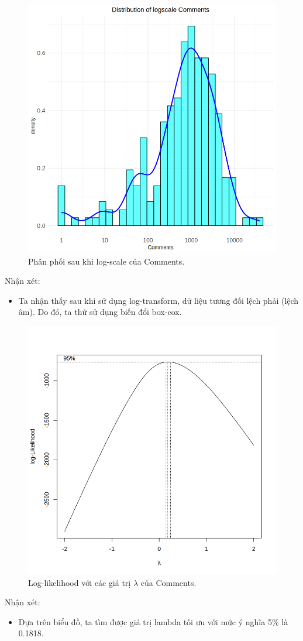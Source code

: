 \begin{figure}[H]
    \centering
    \includegraphics[width=0.75\columnwidth]{csm_figures/comments_logscale_distribution.png}
    \caption{Phân phối sau khi log-scale của Comments.}
    \label{fig:comments_logscale_distribution}
\end{figure}
Nhận xét:
\begin{itemize}
    \item Ta nhận thấy sau khi sử dụng log-transform, dữ liệu tương đối lệch phải (lệch âm). Do đó, ta thử sử dụng biến đổi box-cox.
\end{itemize}

\begin{figure}[H]
    \centering
    \includegraphics[width=0.75\columnwidth]{csm_figures/comments_optimal_lambda.png}
    \caption{Log-likelihood với các giá trị $\lambda$ của Comments.}
    \label{fig:comments_optimal_lambda}
\end{figure}
Nhận xét:
\begin{itemize}
    \item Dựa trên biểu đồ, ta tìm được giá trị lambda tối ưu với mức ý nghĩa 5\% là  0.1818.
\end{itemize}

